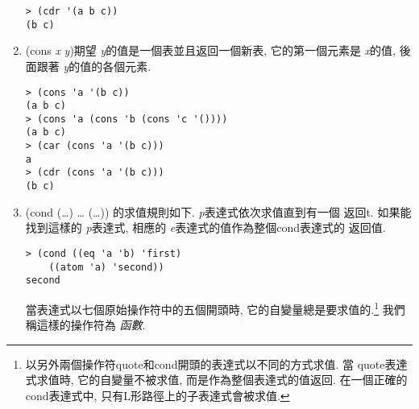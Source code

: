 \documentclass[12pt]{article}
\begin{document}
\begin{CJK}{UTF8}{bsmi}
\begin{enumerate}
\begin{verbatim} 
> (cdr '(a b c)) 
(b c) 
\end{verbatim} 
\item 
(cons 
{\it 
x} 
{\it 
y})期望{\it 
y}的值是一個表並且返回一個新表, 它的第一個元素是{\it 
x}的值, 
後 
面跟著{\it 
y}的值的各個元素. 
\begin{verbatim} 
> (cons 'a '(b c)) 
(a b c) 
> (cons 'a (cons 'b (cons 'c '()))) 
(a b c) 
> (car (cons 'a '(b c))) 
a 
> (cdr (cons 'a '(b c))) 
(b c) 
\end{verbatim} 
\item 
(cond 
(\pone\dots\eone) 
\dots 
(\pn\dots\en)) 
的求值規則如下. 
{\it 
p}表達式依次求值直到有一個 
返回t. 
如果能找到這樣的{\it 
p}表達式, 相應的{\it 
e}表達式的值作為整個cond表達式的 
返回值. 
\begin{verbatim} 
> (cond ((eq 'a 'b) 'first) 
    ((atom 'a) 'second)) 
second 
\end{verbatim} 
當表達式以七個原始操作符中的五個開頭時, 它的自變量總是要求值的.\footnote{以另外兩個操作符quote和cond開頭的表達式以不同的方式求值. 
當 
quote表達式求值時, 
它的自變量不被求值, 而是作為整個表達式的值返回. 
在一個正確的cond表達式中, 
只有L形路徑上的子表達式會被求值.} 
我們稱這樣的操作符為{\em 
函數}. 
\end{enumerate} 

\end{CJK}
\end{document}
